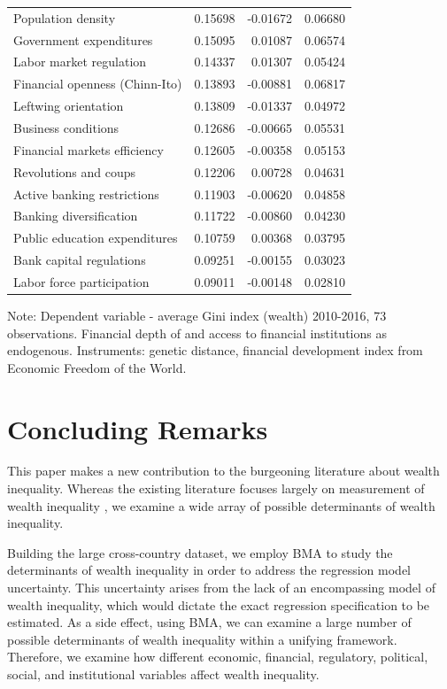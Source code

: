 \documentclass[a4paper,11pt]{article}
\begin{document}
\begin{table}[!ht]
\begin{threeparttable}
\begin{tabular}{lrrr}
		Population density & 0.15698 & -0.01672 & 0.06680 \\ 
		Government expenditures & 0.15095 & 0.01087 & 0.06574 \\ 
		Labor market regulation & 0.14337 & 0.01307 & 0.05424 \\ 
		Financial openness (Chinn-Ito) & 0.13893 & -0.00881 & 0.06817 \\ 
		Leftwing orientation & 0.13809 & -0.01337 & 0.04972 \\ 
		Business conditions & 0.12686 & -0.00665 & 0.05531 \\ 
		Financial markets efficiency & 0.12605 & -0.00358 & 0.05153 \\ 
		Revolutions and coups & 0.12206 & 0.00728 & 0.04631 \\ 
		Active banking restrictions & 0.11903 & -0.00620 & 0.04858 \\ 
		Banking diversification & 0.11722 & -0.00860 & 0.04230 \\ 
		Public education expenditures & 0.10759 & 0.00368 & 0.03795 \\ 
		Bank capital regulations & 0.09251 & -0.00155 & 0.03023 \\ 
		Labor force participation & 0.09011 & -0.00148 & 0.02810 \\ 
		\bottomrule
	\end{tabular}
\begin{tablenotes}
\item Note: Dependent variable - average Gini index (wealth) 2010-2016, 73 observations. Financial depth of and access to financial institutions as endogenous. Instruments: genetic distance, financial development index from Economic Freedom of the World.
\end{tablenotes}
\end{threeparttable}
\end{table}

\section{Concluding Remarks}
\label{sec:conclusion}

This paper makes a new contribution to the burgeoning literature about wealth inequality. Whereas the existing literature focuses largely on measurement of wealth inequality \citep{alvaredoetal2013,daviesetal2011,pikettyandzucman2014,SaezZucman2016}, we examine a wide array of possible determinants of wealth inequality. 

Building the large cross-country dataset, we employ \ac{BMA} to study the determinants of wealth inequality in order to address the regression model uncertainty. This uncertainty arises from the lack of an encompassing model of wealth inequality, which would dictate the exact regression specification to be estimated. As a side effect, using \ac{BMA}, we can examine a large number of possible determinants of wealth inequality within a unifying framework. Therefore, we examine how different economic, financial, regulatory, political, social, and institutional variables affect wealth inequality.  
\end{document}
